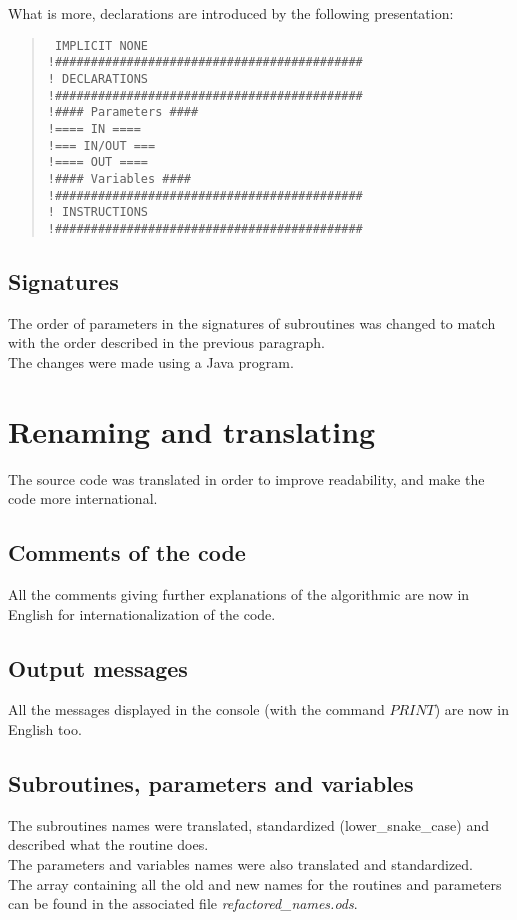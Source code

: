 \newpage
What is more, declarations are introduced by the following presentation: 
\begin{quote}
\texttt{
IMPLICIT NONE \\
!\#\#\#\#\#\#\#\#\#\#\#\#\#\#\#\#\#\#\#\#\#\#\#\#\#\#\#\#\#\#\#\#\#\#\#\#\#\#\#\#\#\#\# \\
! DECLARATIONS \\
!\#\#\#\#\#\#\#\#\#\#\#\#\#\#\#\#\#\#\#\#\#\#\#\#\#\#\#\#\#\#\#\#\#\#\#\#\#\#\#\#\#\#\# \\
!\#\#\#\# Parameters \#\#\#\# \\
!==== IN ==== \\
!=== IN/OUT === \\
!==== OUT ==== \\
!\#\#\#\# Variables \#\#\#\# \\
!\#\#\#\#\#\#\#\#\#\#\#\#\#\#\#\#\#\#\#\#\#\#\#\#\#\#\#\#\#\#\#\#\#\#\#\#\#\#\#\#\#\#\# \\
! INSTRUCTIONS \\
!\#\#\#\#\#\#\#\#\#\#\#\#\#\#\#\#\#\#\#\#\#\#\#\#\#\#\#\#\#\#\#\#\#\#\#\#\#\#\#\#\#\#\#  \\
}
\end{quote}

\subsection{Signatures}
The order of parameters in the signatures of subroutines was changed to match with the order described in the previous paragraph.
\\The changes were made using a Java program.


\section{Renaming and translating}
The source code was translated in order to improve readability, and make the code more international.

\subsection{Comments of the code}
All the comments giving further explanations of the algorithmic are now in English for internationalization of the code.

\subsection{Output messages}
All the messages displayed in the console (with the command $PRINT$) are now in English too.

\subsection{Subroutines, parameters and variables}
The subroutines names were translated, standardized (lower\_snake\_case) and described what the routine does.
\\ The parameters and variables names were also translated and standardized.
\\ The array containing all the old and new names for the routines and parameters can be found in the associated file \textit{refactored\_names.ods}.
